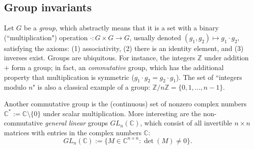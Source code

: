 \documentclass[letterpaper, 10pt]{article}
\theoremstyle{definition}
\begin{document}
\subsection{Group invariants}

Let $G$ be a \textit{group}, which abstractly means that it is a set with a binary (``multiplication") operation $\cdot: G \times G \to G$, usually denoted $(g_1,g_2) \mapsto  g_1 \cdot g_2$, satisfying the axioms: (1) associativity, (2) there is an identity element, and (3) inverses exist. Groups are ubiquitous.  For instance, the integers $\mathbb Z$ under addition $+$ form a group; in fact, an \textit{commutative} group, which has the additional property that multiplication is symmetric ($g_1\cdot g_2 = g_2\cdot g_1$).  The set of ``integers modulo $n$" is also a classical example of a group: $\mathbb Z / n\mathbb Z = \{0, 1, \ldots, n-1\}$.  

Another commutative group is the (continuous) set of nonzero complex numbers $\mathbb C^* := \mathbb C \setminus \{0\}$ under scalar multiplication.  More interesting are the non-commutative \textit{general linear} groups $GL_n(\mathbb C)$, which consist of all invertible $n \times n$ matrices with entries in the complex numbers $\mathbb C$:
\[ GL_n(\mathbb C) := \{ M \in \mathbb C^{n \times n}: \det(M) \neq 0\}.\] 
\end{document}
